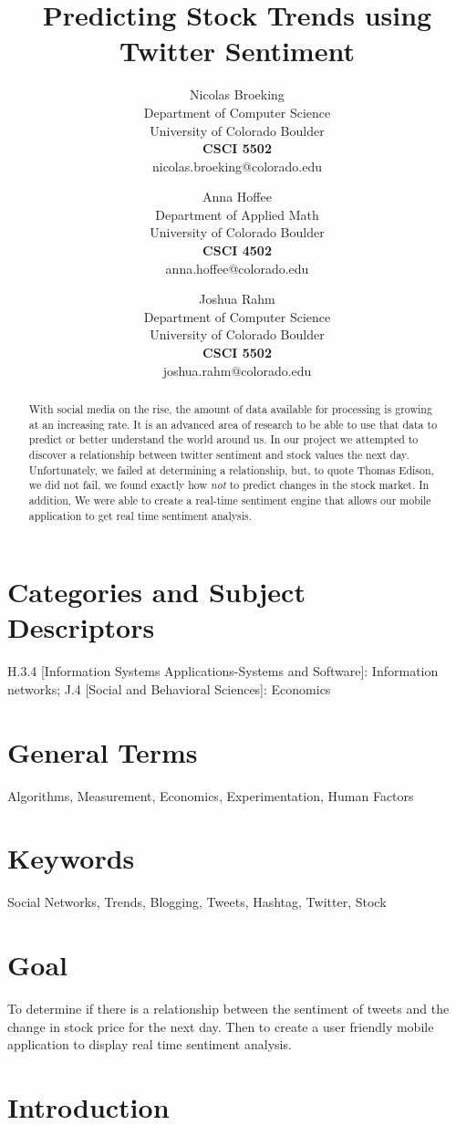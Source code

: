 \documentclass{acm_proc_article-sp}
\title{Predicting Stock Trends using Twitter Sentiment}
\author{
    Nicolas Broeking \\
    \small Department of Computer Science \\
    \small University of Colorado Boulder \\
    \small \textbf{CSCI 5502} \\
    \small nicolas.broeking@colorado.edu \\
    \and
    Anna Hoffee \\
    \small Department of Applied Math \\
    \small University of Colorado Boulder \\
    \small \textbf{CSCI 4502} \\
    \small anna.hoffee@colorado.edu \\
    \and
    Joshua Rahm \\
    \small Department of Computer Science \\
    \small University of Colorado Boulder \\
    \small \textbf{CSCI 5502} \\
    \small joshua.rahm@colorado.edu \\
}
\begin{document}
\begin{abstract} 

With social media on the rise, the amount of data available for processing is
growing at an increasing rate. It is an advanced area of research to be able to
use that data to predict or better understand the world around us. In our
project we attempted to discover a relationship between twitter sentiment and
stock values the next day. Unfortunately, we failed at determining a
relationship, but, to quote Thomas Edison, we did not fail, we found exactly how \emph{not}
to predict changes in the stock market. In addition, We were able to create a real-time
sentiment engine that allows our mobile application to get real time sentiment
analysis.

\end{abstract}

\section*{Categories and Subject\\ Descriptors}

H.3.4 [Information Systems Applications-Systems and Software]: Information
networks; J.4 [Social and Behavioral Sciences]: Economics

\section*{General Terms}
Algorithms, Measurement, Economics, Experimentation, Human Factors

\section*{Keywords}

Social Networks, Trends, Blogging, Tweets, Hashtag, Twitter, Stock

\section*{Goal}

To determine if there is a relationship between the sentiment of tweets and the
change in stock price for the next day. Then to create a user friendly mobile
application to display real time sentiment analysis.

\section{Introduction}
\end{document}
